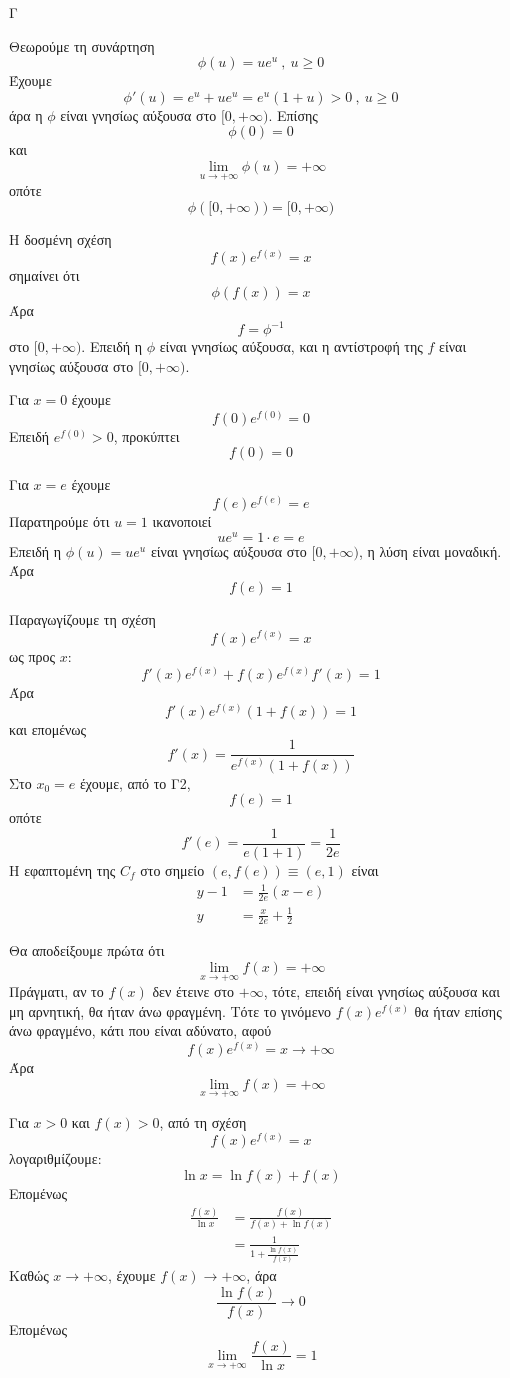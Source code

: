 \begin{thema}{Γ}
\begin{erwthma}
\item Θεωρούμε τη συνάρτηση
\[\phi(u)=ue^u\ ,\ u\geq 0\]
Έχουμε
\[\phi'(u)=e^u+ue^u=e^u(1+u)>0\ ,\ u\geq 0\]
άρα η $\phi$ είναι γνησίως αύξουσα στο $[0,+\infty)$.
Επίσης
\[\phi(0)=0\]
και
\[\lim\limits_{u\to+\infty}\phi(u)=+\infty\]
οπότε
\[\phi([0,+\infty))=[0,+\infty)\]

Η δοσμένη σχέση
\[f(x)e^{f(x)}=x\]
σημαίνει ότι
\[\phi(f(x))=x\]
Άρα
\[f=\phi^{-1}\]
στο $[0,+\infty)$. Επειδή η $\phi$ είναι γνησίως αύξουσα, και η αντίστροφή της $f$ είναι γνησίως αύξουσα στο $[0,+\infty)$.

\item Για $x=0$ έχουμε
\[f(0)e^{f(0)}=0\]
Επειδή $e^{f(0)}>0$, προκύπτει
\[f(0)=0\]

Για $x=e$ έχουμε
\[f(e)e^{f(e)}=e\]
Παρατηρούμε ότι $u=1$ ικανοποιεί
\[ue^u=1\cdot e=e\]
Επειδή η $\phi(u)=ue^u$ είναι γνησίως αύξουσα στο $[0,+\infty)$, η λύση είναι μοναδική.
Άρα
\[f(e)=1\]

\item Παραγωγίζουμε τη σχέση
\[f(x)e^{f(x)}=x\]
ως προς $x$:
\[f'(x)e^{f(x)}+f(x)e^{f(x)}f'(x)=1\]
Άρα
\[f'(x)e^{f(x)}(1+f(x))=1\]
και επομένως
\[f'(x)=\frac{1}{e^{f(x)}(1+f(x))}\]
Στο $x_0=e$ έχουμε, από το Γ2,
\[f(e)=1\]
οπότε
\[f'(e)=\frac{1}{e(1+1)}=\frac{1}{2e}\]
Η εφαπτομένη της $C_f$ στο σημείο $(e,f(e))\equiv(e,1)$ είναι
\begin{align*}
y-1&=\frac{1}{2e}(x-e)\\
y&=\frac{x}{2e}+\frac{1}{2}
\end{align*}

\item Θα αποδείξουμε πρώτα ότι
\[\lim\limits_{x\to+\infty}f(x)=+\infty\]
Πράγματι, αν το $f(x)$ δεν έτεινε στο $+\infty$, τότε, επειδή είναι γνησίως αύξουσα και μη αρνητική, θα ήταν άνω φραγμένη.
Τότε το γινόμενο $f(x)e^{f(x)}$ θα ήταν επίσης άνω φραγμένο, κάτι που είναι αδύνατο, αφού
\[f(x)e^{f(x)}=x\to+\infty\]
Άρα
\[\lim\limits_{x\to+\infty}f(x)=+\infty\]

Για $x>0$ και $f(x)>0$, από τη σχέση
\[f(x)e^{f(x)}=x\]
λογαριθμίζουμε:
\[\ln x=\ln f(x)+f(x)\]
Επομένως
\begin{align*}
\frac{f(x)}{\ln x}
&=\frac{f(x)}{f(x)+\ln f(x)}\\
&=\frac{1}{1+\frac{\ln f(x)}{f(x)}}
\end{align*}
Καθώς $x\to+\infty$, έχουμε $f(x)\to+\infty$, άρα
\[\frac{\ln f(x)}{f(x)}\to 0\]
Επομένως
\[\lim\limits_{x\to+\infty}\frac{f(x)}{\ln x}=1\]
\end{erwthma}
\end{thema}

